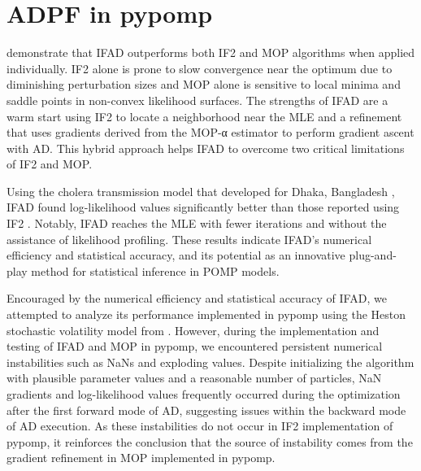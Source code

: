 \documentclass[11pt]{report}
\begin{document}
\newpage
\chapter{ADPF in pypomp}\label{chap:adpf}
\textbf{\citet{tan2024accelerated}} demonstrate that IFAD outperforms both IF2 and MOP algorithms when applied individually. IF2 alone is prone to slow convergence near the optimum due to diminishing perturbation sizes and MOP alone is sensitive to local minima and saddle points in non-convex likelihood surfaces. The strengths of IFAD are a warm start using IF2 to locate a neighborhood near the MLE and a refinement that uses gradients derived from the MOP-α estimator to perform gradient ascent with AD. This hybrid approach helps IFAD to overcome two critical limitations of IF2 and MOP.

Using the cholera transmission model that developed for Dhaka, Bangladesh \textbf{\citet{king2008inapparent}}, IFAD found log-likelihood values significantly better than those reported using IF2 \textbf{\citet{ionides2015inference}}. Notably, IFAD reaches the MLE with fewer iterations and without the assistance of likelihood profiling. These results indicate IFAD's numerical efficiency and statistical accuracy, and its potential as an innovative plug-and-play method for statistical inference in POMP models.

Encouraged by the numerical efficiency and statistical accuracy of IFAD, we attempted to analyze its performance implemented in pypomp using the Heston stochastic volatility model from \textbf{\citet{sunmodel}}. However, during the implementation and testing of IFAD and MOP in pypomp, we encountered persistent numerical instabilities such as NaNs and exploding values. Despite initializing the algorithm with plausible parameter values and a reasonable number of particles, NaN gradients and log-likelihood values frequently occurred during the optimization after the first forward mode of AD, suggesting issues within the backward mode of AD execution. As these instabilities do not occur in IF2 implementation of pypomp, it reinforces the conclusion that the source of instability comes from the gradient refinement in MOP implemented in pypomp. 


\end{document}
